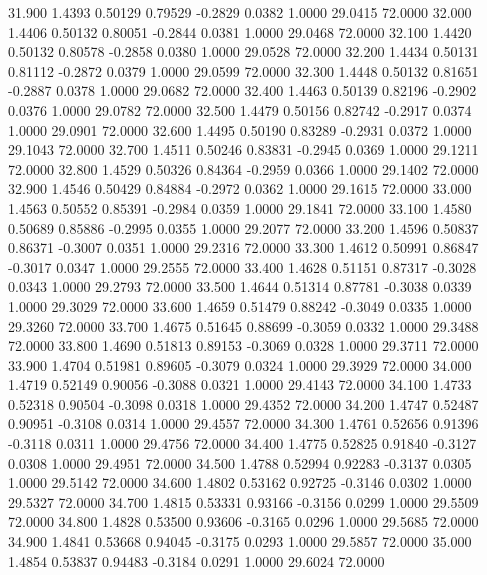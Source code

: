   31.900   1.4393   0.50129   0.79529  -0.2829   0.0382   1.0000  29.0415  72.0000
  32.000   1.4406   0.50132   0.80051  -0.2844   0.0381   1.0000  29.0468  72.0000
  32.100   1.4420   0.50132   0.80578  -0.2858   0.0380   1.0000  29.0528  72.0000
  32.200   1.4434   0.50131   0.81112  -0.2872   0.0379   1.0000  29.0599  72.0000
  32.300   1.4448   0.50132   0.81651  -0.2887   0.0378   1.0000  29.0682  72.0000
  32.400   1.4463   0.50139   0.82196  -0.2902   0.0376   1.0000  29.0782  72.0000
  32.500   1.4479   0.50156   0.82742  -0.2917   0.0374   1.0000  29.0901  72.0000
  32.600   1.4495   0.50190   0.83289  -0.2931   0.0372   1.0000  29.1043  72.0000
  32.700   1.4511   0.50246   0.83831  -0.2945   0.0369   1.0000  29.1211  72.0000
  32.800   1.4529   0.50326   0.84364  -0.2959   0.0366   1.0000  29.1402  72.0000
  32.900   1.4546   0.50429   0.84884  -0.2972   0.0362   1.0000  29.1615  72.0000
  33.000   1.4563   0.50552   0.85391  -0.2984   0.0359   1.0000  29.1841  72.0000
  33.100   1.4580   0.50689   0.85886  -0.2995   0.0355   1.0000  29.2077  72.0000
  33.200   1.4596   0.50837   0.86371  -0.3007   0.0351   1.0000  29.2316  72.0000
  33.300   1.4612   0.50991   0.86847  -0.3017   0.0347   1.0000  29.2555  72.0000
  33.400   1.4628   0.51151   0.87317  -0.3028   0.0343   1.0000  29.2793  72.0000
  33.500   1.4644   0.51314   0.87781  -0.3038   0.0339   1.0000  29.3029  72.0000
  33.600   1.4659   0.51479   0.88242  -0.3049   0.0335   1.0000  29.3260  72.0000
  33.700   1.4675   0.51645   0.88699  -0.3059   0.0332   1.0000  29.3488  72.0000
  33.800   1.4690   0.51813   0.89153  -0.3069   0.0328   1.0000  29.3711  72.0000
  33.900   1.4704   0.51981   0.89605  -0.3079   0.0324   1.0000  29.3929  72.0000
  34.000   1.4719   0.52149   0.90056  -0.3088   0.0321   1.0000  29.4143  72.0000
  34.100   1.4733   0.52318   0.90504  -0.3098   0.0318   1.0000  29.4352  72.0000
  34.200   1.4747   0.52487   0.90951  -0.3108   0.0314   1.0000  29.4557  72.0000
  34.300   1.4761   0.52656   0.91396  -0.3118   0.0311   1.0000  29.4756  72.0000
  34.400   1.4775   0.52825   0.91840  -0.3127   0.0308   1.0000  29.4951  72.0000
  34.500   1.4788   0.52994   0.92283  -0.3137   0.0305   1.0000  29.5142  72.0000
  34.600   1.4802   0.53162   0.92725  -0.3146   0.0302   1.0000  29.5327  72.0000
  34.700   1.4815   0.53331   0.93166  -0.3156   0.0299   1.0000  29.5509  72.0000
  34.800   1.4828   0.53500   0.93606  -0.3165   0.0296   1.0000  29.5685  72.0000
  34.900   1.4841   0.53668   0.94045  -0.3175   0.0293   1.0000  29.5857  72.0000
  35.000   1.4854   0.53837   0.94483  -0.3184   0.0291   1.0000  29.6024  72.0000
